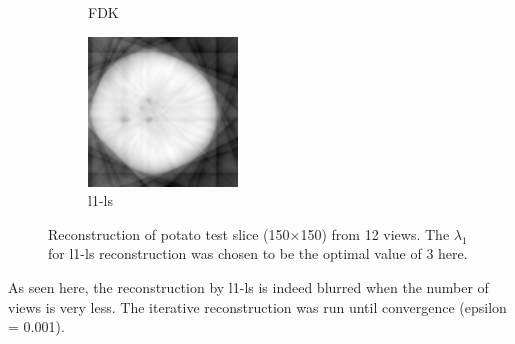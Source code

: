 \documentclass{article}
\begin{document}
\begin{figure}[!h]
\begin{subfigure}[b]{0.3\linewidth}
        \caption{FDK}
    \end{subfigure}
    \begin{subfigure}[b]{0.3\linewidth}
        \includegraphics[width=\textwidth]{../images/potato/2D/cs_blurred_results/12_views/result_CS_lambda0_3.00.png}
        \caption{l1-ls}
    \end{subfigure}
     \caption{Reconstruction of potato test slice (150$\times$150) from 12 views. The $\lambda_1$ for l1-ls reconstruction was chosen to be the optimal value of 3 here.} 
\label{fig:cs_blurred_12_views}
\end{figure}
As seen here, the reconstruction by l1-ls is indeed blurred when the number of views is very less. The iterative reconstruction was run until convergence (epsilon = 0.001).
\end{document}
